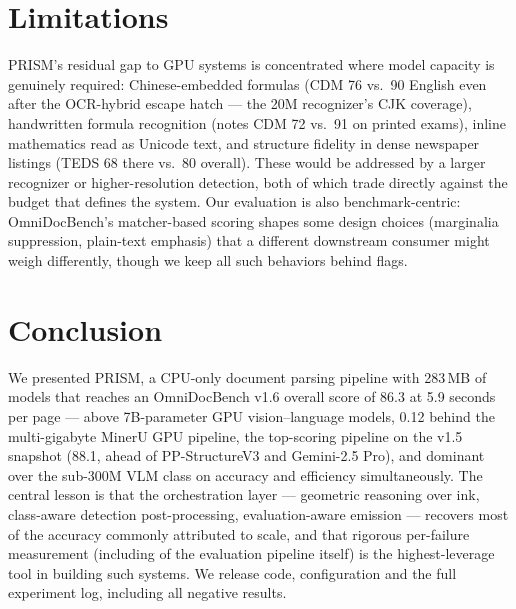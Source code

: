 \section{Limitations}
\label{sec:limitations}

PRISM's residual gap to GPU systems is concentrated where model capacity is genuinely required: Chinese-embedded formulas (CDM 76 vs.\ 90 English even after the OCR-hybrid escape hatch --- the 20M recognizer's CJK coverage), handwritten formula recognition (notes CDM 72 vs.\ 91 on printed exams), inline mathematics read as Unicode text, and structure fidelity in dense newspaper listings (TEDS 68 there vs.\ 80 overall). These would be addressed by a larger recognizer or higher-resolution detection, both of which trade directly against the budget that defines the system. Our evaluation is also benchmark-centric: OmniDocBench's matcher-based scoring shapes some design choices (marginalia suppression, plain-text emphasis) that a different downstream consumer might weigh differently, though we keep all such behaviors behind flags.

\section{Conclusion}
\label{sec:conclusion}

We presented PRISM, a CPU-only document parsing pipeline with 283\,MB of models that reaches an OmniDocBench v1.6 overall score of 86.3 at 5.9 seconds per page --- above 7B-parameter GPU vision--language models, 0.12 behind the multi-gigabyte MinerU GPU pipeline, the top-scoring pipeline on the v1.5 snapshot (88.1, ahead of PP-StructureV3 and Gemini-2.5 Pro), and dominant over the sub-300M VLM class on accuracy and efficiency simultaneously. The central lesson is that the orchestration layer --- geometric reasoning over ink, class-aware detection post-processing, evaluation-aware emission --- recovers most of the accuracy commonly attributed to scale, and that rigorous per-failure measurement (including of the evaluation pipeline itself) is the highest-leverage tool in building such systems. We release code, configuration and the full experiment log, including all negative results.
